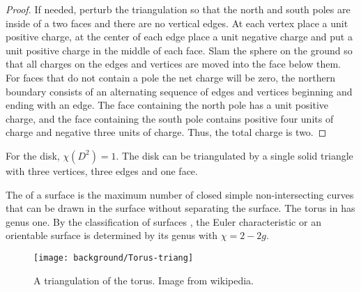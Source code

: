\begin{proof}
If needed, perturb the triangulation so that the north and south poles are 
inside of a two faces and there are no vertical edges. At each vertex place a unit positive
charge, at the center of each edge place a unit negative charge and put a unit positive
charge in the middle of each face. Slam the sphere on the ground so that all charges
on the edges and vertices are moved into the face below them. For faces that do not contain a pole
the net charge will be zero, the northern boundary consists of an alternating sequence
of edges and vertices  beginning  and ending with an edge.
The face containing the north pole has a unit positive charge, and the face containing the south
pole contains positive four units of charge and negative three units of charge.
Thus, the total charge is two.

\end{proof}


For the disk, $\chi(D^2)=1$. The disk can be triangulated by
a single solid triangle with three vertices, three edges and one face.

The  of a surface is the maximum number of closed simple
non-intersecting curves that can be drawn in the surface without separating
the surface.
The torus in  has genus one.
By the classification of surfaces \cite{munkres}, the Euler characteristic or an orientable surface
is determined by its genus with $\chi=2-2g$.



\begin{figure}[htb]
\centering
\texttt{[image: background/Torus-triang]}
\caption{A triangulation of the torus. Image from wikipedia.}
\label{fig:triangulated-torus}
\end{figure}


